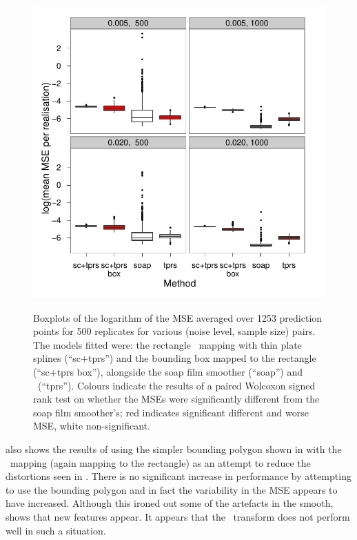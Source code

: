 \begin{figure}[p]
\centering
\includegraphics[width=6in]{sc/tablecode/wt2-boxplot.pdf} \\
\caption{Boxplots of the logarithm of the MSE averaged over 1253 prediction points for 500 replicates for various (noise level, sample size) pairs. The models fitted were: the rectangle \sch\ mapping with thin plate splines (``sc+tprs'') and the bounding box mapped to the rectangle (``sc+tprs box''), alongside the soap film smoother (``soap'') and \tprs\ (``tprs''). Colours indicate the results of a paired Wolcoxon signed rank test on whether the MSEs were significantly different from the soap film smoother's; red indicates significant different and worse MSE, white non-significant.}
\label{wigglytop2-boxplots}
\end{figure}

 also shows the results of using the simpler bounding polygon shown in  with the \sch\ mapping (again mapping to the rectangle) as  an attempt to reduce the distortions seen in . There is no significant increase in performance by attempting to use the bounding polygon and in fact the variability in the MSE appears to have increased. Although this ironed out some of the artefacts in the smooth,  shows that new features appear. It appears that the \sch\ transform does not perform well in such a situation.

